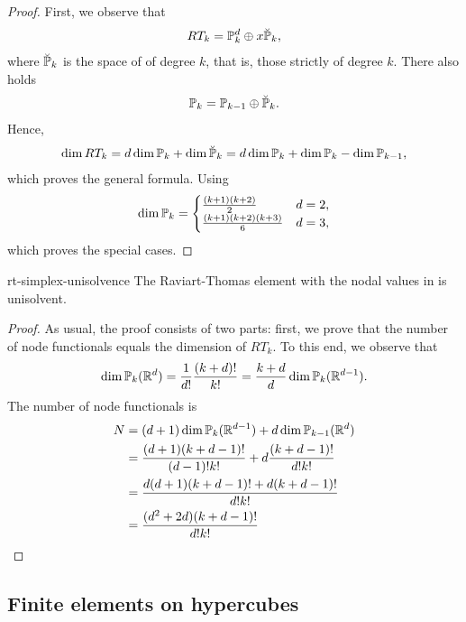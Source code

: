 \begin{proof}
  First, we observe that
  \begin{gather*}
    RT_k = \P_k^d \oplus x\breve\P_k,
  \end{gather*}
  where $\breve \P_k$ is the space of  of degree $k$, that is, those strictly of degree
  $k$. There also holds
  \begin{gather*}
    \P_{k} = \P_{k-1} \oplus \breve \P_k.
  \end{gather*}
  Hence,
  \begin{gather*}
    \dim RT_k = d \dim \P_k + \dim\breve\P_k = d \dim \P_k + \dim \P_k
    - \dim \P_{k-1},
  \end{gather*}
  which proves the general formula. Using
  \begin{gather}
    \dim\P_k =
    \begin{cases}
      \frac{(k+1)(k+2)}{2} & d=2,\\
      \frac{(k+1)(k+2)(k+3)}{6} & d=3,
    \end{cases}
  \end{gather}
  which proves the special cases.
\end{proof}

\begin{Lemma}{rt-simplex-unisolvence}
  The Raviart-Thomas element with the nodal values in
   is unisolvent.
\end{Lemma}

\begin{proof}
  As usual, the proof consists of two parts: first, we prove that the
  number of node functionals equals the dimension of $RT_k$. To this
  end, we observe that
  \begin{gather*}
    \dim \P_k(\R^d) = \frac1{d!} \frac{(k+d)!}{k!}
    = \frac{k+d}d \dim \P_k(\R^{d-1}).
  \end{gather*}
  The number of node functionals is
  \begin{align*}
    N &= (d+1) \dim \P_k(\R^{d-1}) + d \dim \P_{k-1}(\R^d)
    \\
    &= \frac{(d+1)(k+d-1)!}{(d-1)!k!}
      + d\frac{(k+d-1)!}{d! k!}\\
    &= \frac{d(d+1)(k+d-1)!+d(k+d-1)!}{d!k!}
    \\
    &= \frac{(d^2+2d)(k+d-1)!}{d!k!}
  \end{align*}

\end{proof}
\subsection{Finite elements on hypercubes}

